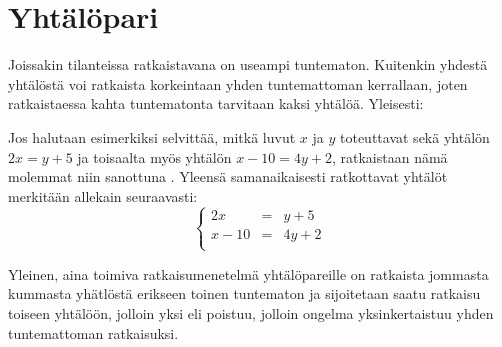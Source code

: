 
\section*{Yhtälöpari}

Joissakin tilanteissa ratkaistavana on useampi tuntematon. Kuitenkin yhdestä yhtälöstä voi ratkaista korkeintaan yhden tuntemattoman kerrallaan, joten ratkaistaessa kahta tuntematonta tarvitaan kaksi yhtälöä. Yleisesti:


Jos halutaan esimerkiksi selvittää, mitkä luvut $x$ ja $y$ toteuttavat sekä yhtälön $2x=y+5$ ja toisaalta 
myös yhtälön $x-10=4y+2$, ratkaistaan nämä molemmat niin sanottuna . Yleensä samanaikaisesti ratkottavat yhtälöt merkitään allekain seuraavasti:
$$\left\{    
    \begin{array}{rcl}
        2x&=&y+5 \\
        x-10&=&4y+2 \\
    \end{array}
    \right.$$

Yleinen, aina toimiva ratkaisumenetelmä yhtälöpareille on ratkaista jommasta kummasta yhätlöstä erikseen toinen tuntematon ja sijoitetaan saatu ratkaisu toiseen yhtälöön, jolloin yksi  eli poistuu, jolloin ongelma yksinkertaistuu yhden tuntemattoman ratkaisuksi.

